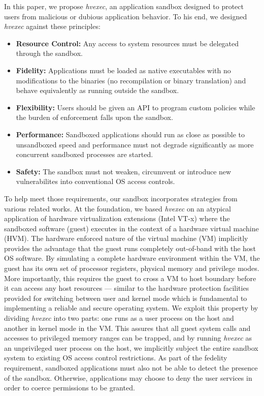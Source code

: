 \documentclass{article}
\newcommand{\PROJNAME}{\textit{hvexec}}
\begin{document}
In this paper, we propose \PROJNAME{}, an application sandbox designed to protect users from malicious or dubious application behavior.
To his end, we designed \PROJNAME{} against these principles:
\begin{itemize}
    \item \textbf{Resource Control:}
        Any access to system resources must be delegated through the sandbox.
    \item \textbf{Fidelity:}
        Applications must be loaded as native executables with no modifications to the binaries
        (no recompilation or binary translation) and behave equivalently as running outside the sandbox.
    \item \textbf{Flexibility:}
        Users should be given an API to program custom policies while the burden of enforcement falls upon the sandbox.
    \item \textbf{Performance:}
        Sandboxed applications should run as close as possible to unsandboxed speed
        and performance must not degrade significantly as more concurrent sandboxed processes are started.
    \item \textbf{Safety:}
        The sandbox must not weaken, circumvent or introduce new vulnerabilites into conventional OS access controls.
\end{itemize}
To help meet those requirements, our sandbox incorporates strategies from various related works.
At the foundation, we based \PROJNAME{} on an atypical application of hardware virtualization extensions (Intel VT-x) where
the sandboxed software (guest) executes in the context of a hardware virtual machine (HVM).
The hardware enforced nature of the virtual machine (VM) implicitly provides the advantage that the guest runs completely out-of-band with the host OS software.
By simulating a complete hardware environment within the VM, the guest has its own set of processor registers, physical memory and privilege modes.
More importantly, this requires the guest to cross a VM to host boundary before it can access any host resources
— similar to the hardware protection facilities provided for switching between user and kernel mode which is fundamental to implementing a reliable and secure operating system.
We exploit this property by dividing \PROJNAME{} into two parts: one runs as a user process on the host and another in kernel mode in the VM.
This assures that all guest system calls and accesses to privileged memory ranges can be trapped, and
by running \PROJNAME{} as an unprivileged user process on the host, we implicitly subject the
entire sandbox system to existing OS access control restrictions.
As part of the fedelity requirement, sandboxed applications must also not be able to detect the presence of the sandbox.
Otherwise, applications may choose to deny the user services in order to coerce permissions to be granted.
\end{document}
